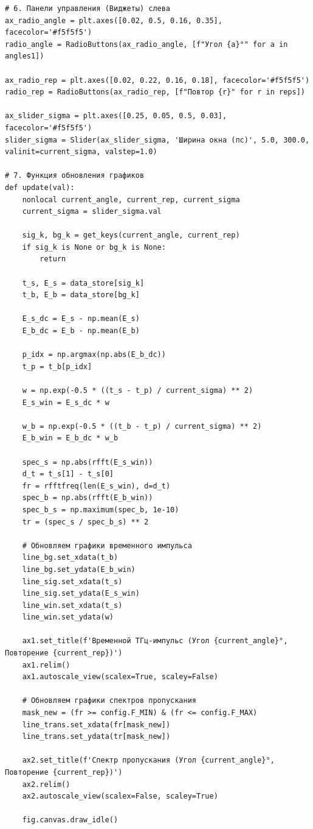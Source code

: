 \begin{listing}[H]
	\caption{Интерактивное управление сеткой графиков ()}\label{lst:plot_grid}
	\begin{verbatim}
# 6. Панели управления (Виджеты) слева
ax_radio_angle = plt.axes([0.02, 0.5, 0.16, 0.35], facecolor='#f5f5f5')
radio_angle = RadioButtons(ax_radio_angle, [f"Угол {a}°" for a in angles1])

ax_radio_rep = plt.axes([0.02, 0.22, 0.16, 0.18], facecolor='#f5f5f5')
radio_rep = RadioButtons(ax_radio_rep, [f"Повтор {r}" for r in reps])

ax_slider_sigma = plt.axes([0.25, 0.05, 0.5, 0.03], facecolor='#f5f5f5')
slider_sigma = Slider(ax_slider_sigma, 'Ширина окна (пс)', 5.0, 300.0, valinit=current_sigma, valstep=1.0)

# 7. Функция обновления графиков
def update(val):
    nonlocal current_angle, current_rep, current_sigma
    current_sigma = slider_sigma.val
    
    sig_k, bg_k = get_keys(current_angle, current_rep)
    if sig_k is None or bg_k is None:
        return
        
    t_s, E_s = data_store[sig_k]
    t_b, E_b = data_store[bg_k]
    
    E_s_dc = E_s - np.mean(E_s)
    E_b_dc = E_b - np.mean(E_b)
    
    p_idx = np.argmax(np.abs(E_b_dc))
    t_p = t_b[p_idx]
    
    w = np.exp(-0.5 * ((t_s - t_p) / current_sigma) ** 2)
    E_s_win = E_s_dc * w
    
    w_b = np.exp(-0.5 * ((t_b - t_p) / current_sigma) ** 2)
    E_b_win = E_b_dc * w_b
    
    spec_s = np.abs(rfft(E_s_win))
    d_t = t_s[1] - t_s[0]
    fr = rfftfreq(len(E_s_win), d=d_t)
    spec_b = np.abs(rfft(E_b_win))
    spec_b_s = np.maximum(spec_b, 1e-10)
    tr = (spec_s / spec_b_s) ** 2
    
    # Обновляем графики временного импульса
    line_bg.set_xdata(t_b)
    line_bg.set_ydata(E_b_win)
    line_sig.set_xdata(t_s)
    line_sig.set_ydata(E_s_win)
    line_win.set_xdata(t_s)
    line_win.set_ydata(w)
    
    ax1.set_title(f'Временной ТГц-импульс (Угол {current_angle}°, Повторение {current_rep})')
    ax1.relim()
    ax1.autoscale_view(scalex=True, scaley=False)
    
    # Обновляем графики спектров пропускания
    mask_new = (fr >= config.F_MIN) & (fr <= config.F_MAX)
    line_trans.set_xdata(fr[mask_new])
    line_trans.set_ydata(tr[mask_new])
    
    ax2.set_title(f'Спектр пропускания (Угол {current_angle}°, Повторение {current_rep})')
    ax2.relim()
    ax2.autoscale_view(scalex=False, scaley=True)
    
    fig.canvas.draw_idle()
	\end{verbatim}
\end{listing}

